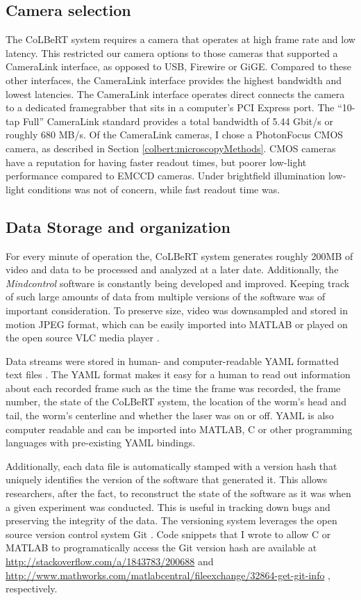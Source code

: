 \subsection{Camera selection}
The CoLBeRT system requires a camera that operates at high  frame rate and low latency. This restricted our camera options to those cameras that supported a CameraLink interface, as opposed to USB, Firewire or GiGE. Compared to these other interfaces, the CameraLink interface provides the highest bandwidth and lowest latencies. The CameraLink interface operates direct connects the camera to a dedicated framegrabber that sits in a computer's PCI Express port. The ``10-tap Full'' CameraLink standard provides a total bandwidth of 5.44 Gbit/s  or roughly 680 MB/s. Of the CameraLink cameras, I chose a PhotonFocus CMOS camera,  as described in  Section \ref{colbert:microscopyMethods}. CMOS cameras have a reputation for having faster readout times, but poorer low-light performance compared to EMCCD cameras. Under brightfield illumination low-light conditions was not of concern, while fast readout time was.

\subsection{Data Storage and organization}
For every minute of operation the, CoLBeRT system generates roughly 200MB of  video and data to be processed and analyzed at a later date. Additionally, the \emph{Mindcontrol} software is constantly being developed and improved. Keeping track of such large amounts of data  from multiple versions of the software was of important consideration. To preserve size, video was downsampled and stored in  motion JPEG format, which can be easily imported into MATLAB or played on the open source VLC media player \citep{the_video_lan_organization_videolan_2012}. 

Data streams were stored in human- and computer-readable YAML formatted text files \citep{evans_official_2011}. The YAML format makes it easy for a human to  read out information about each recorded frame such as the time the frame was recorded, the frame number, the state of the CoLBeRT system, the location of the worm's head and tail, the worm's centerline and whether the laser was on or off. YAML is also computer readable and can be imported into MATLAB, C or other programming languages with pre-existing YAML bindings. 

Additionally, each data file is automatically stamped with a version hash that uniquely identifies the version of the software that generated it. This allows researchers, after the fact, to reconstruct the state of the software as it was when a given experiment was conducted. This is useful in tracking down bugs and preserving the integrity of the data.  The versioning system leverages the open source version control system Git \citep{loeliger_version_2009}. Code snippets that I wrote to allow C or MATLAB to programatically access the Git version hash are available at \url{http://stackoverflow.com/a/1843783/200688} and \url{http://www.mathworks.com/matlabcentral/fileexchange/32864-get-git-info} , respectively. 




